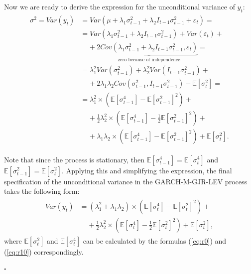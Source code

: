 \documentclass[authoryear, 1p]{elsarticle}
\numberwithin{equation}{section}
\begin{document}
\begin{pot}
Now we are ready to derive the expression for the unconditional variance of $y_{t}$:
\begin{align} \label{eq:r11}
\begin{split}
\sigma^2=Var(y_{t}) & =Var\left(\mu+\lambda_{1}\sigma^{2}_{t-1}+\lambda_{2} I_{t-1}\sigma^{2}_{t-1}+\varepsilon_{t}\right)= \\
& =Var\left(\lambda_{1}\sigma^{2}_{t-1}+\lambda_{2} I_{t-1}\sigma^{2}_{t-1}\right) + Var\left(\varepsilon_{t}\right) + \\
& \;\;\;\; + 2\underbrace{Cov\left(\lambda_{1}\sigma^{2}_{t-1}+\lambda_{2} I_{t-1}\sigma^{2}_{t-1},\varepsilon_{t}\right)}_{\text{zero because of independence}}= \\
& =\lambda_{1}^2Var\left(\sigma^{2}_{t-1}\right)+\lambda_{2}^2Var\left(I_{t-1}\sigma^{2}_{t-1}\right)+ \\
& \;\;\;\; + 2\lambda_{1}\lambda_{2}Cov\left(\sigma^{2}_{t-1}, I_{t-1}\sigma^{2}_{t-1}\right)+\mathbb{E}\left[\sigma^2_{t}\right] = \\
& =\lambda_{1}^2 \times \left(\mathbb{E}\left[\sigma^4_{t-1}\right]-\mathbb{E}\left[\sigma^2_{t-1}\right]^2\right) + \\
& \;\;\;\; + \frac{1}{2} \lambda_{2}^2 \times \left(\mathbb{E}\left[\sigma^4_{t-1}\right] - \frac{1}{2} \mathbb{E}\left[\sigma^2_{t-1}\right]^2\right) + \\
& \;\;\;\; + \lambda_{1} \lambda_{2} \times \left(\mathbb{E}\left[\sigma^4_{t-1}\right] - \mathbb{E}\left[\sigma^2_{t-1}\right]^2\right) + \mathbb{E}\left[\sigma^2_{t}\right].
\end{split}
\end{align}

Note that since the process is stationary, then $\mathbb{E}\left[\sigma^4_{t-1}\right] = \mathbb{E}\left[\sigma^4_{t}\right]$ and $\mathbb{E}\left[\sigma^2_{t-1}\right] = \mathbb{E}\left[\sigma^2_{t}\right]$. Applying this and simplifying the expression, the final specification of the unconditional variance in the GARCH-M-GJR-LEV process takes the following form:
\begin{align}\label{eq:r12}
\begin{split}
Var\left(y_{t}\right) & =\left(\lambda_{1}^2 + \lambda_{1} \lambda_{2}\right) \times \left(\mathbb{E}\left[\sigma^4_{t}\right] - \mathbb{E}\left[\sigma^2_{t}\right]^2\right) + \\ & \;\;\;\; + \frac{1}{2} \lambda^2_{2} \times \left(\mathbb{E}\left[\sigma^4_{t}\right] - \frac{1}{2} \mathbb{E}\left[\sigma^2_{t}\right]^2\right) + \mathbb{E}\left[\sigma^2_{t}\right],
\end{split}
\end{align}
where $\mathbb{E}\left[\sigma_{t}^2\right]$ and $\mathbb{E}\left[\sigma_{t}^4\right]$ can be calculated by the formulas (\ref{eq:r0}) and (\ref{eq:r10}) correspondingly.
\end{pot}
\hfill$\square$
 
\end{document}
